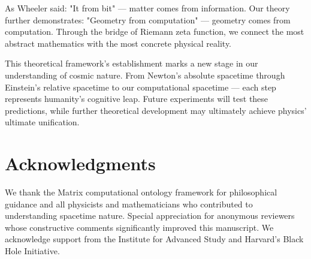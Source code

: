 \documentclass[12pt,a4paper]{article}
\begin{document}
As Wheeler said: "It from bit" — matter comes from information. Our theory further demonstrates: "Geometry from computation" — geometry comes from computation. Through the bridge of Riemann zeta function, we connect the most abstract mathematics with the most concrete physical reality.

This theoretical framework's establishment marks a new stage in our understanding of cosmic nature. From Newton's absolute spacetime through Einstein's relative spacetime to our computational spacetime — each step represents humanity's cognitive leap. Future experiments will test these predictions, while further theoretical development may ultimately achieve physics' ultimate unification.

\section*{Acknowledgments}

We thank the Matrix computational ontology framework for philosophical guidance and all physicists and mathematicians who contributed to understanding spacetime nature. Special appreciation for anonymous reviewers whose constructive comments significantly improved this manuscript. We acknowledge support from the Institute for Advanced Study and Harvard's Black Hole Initiative.
\end{document}
